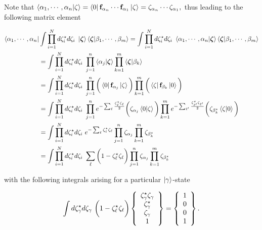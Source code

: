 \documentclass{homework}
\begin{document}
\begin{tcolorbox}
Note that $ \bra{\alpha_1, \cdots, \alpha_n} \ket{\zeta} = \bra{0} {{\bf f}}_{\alpha_n} \cdots {{\bf f}}_{\alpha_1} \ket{\zeta} = \zeta_{\alpha_n} \cdots \zeta_{\alpha_1},$
thus leading to the following matrix element

\begin{equation}
    \begin{split}
        \bra{\alpha_1, \cdots, \alpha_n}& \int \prod_{i=1}^{N} d\zeta^\star_i d\zeta_i \textnormal{ } \ket{\bm{\zeta}}\bra{\bm{\zeta}} \ket{\beta_1, \cdots, \beta_m} = \int \prod_{i=1}^{N} d\zeta^\star_i d\zeta_i \textnormal{ } \bra{\alpha_1, \cdots, \alpha_n}\ket{\bm{\zeta}} \bra{\bm{\zeta}} \ket{\beta_1, \cdots, \beta_m}\\
        &= \int \prod_{i=1}^{N} d\zeta^\star_i d\zeta_i \textnormal{ } \prod_{j=1}^{n} \bra{\alpha_j}\ket{\bm{\zeta}} \prod_{k=1}^{m} \bra{\bm{\zeta}} \ket{\beta_k} \\
        &= \int \prod_{i=1}^{N} d\zeta^\star_i d\zeta_i \textnormal{ } \prod_{j=1}^{n} \bigg(\bra{0} {{\bf f}}_{\alpha_j} \ket{\zeta}\bigg) \prod_{k=1}^{m}\bigg(\bra{\zeta} {{\bf f}}_{\beta_k} \ket{0}\bigg) \\
        &= \int \prod_{i=1}^{N} d\zeta^\star_i d\zeta_i \textnormal{ } \prod_{j=1}^{n} e^{-\sum_{\ell} \frac{\zeta^\star_\ell\zeta_\ell}{2}} \bigg(\zeta_{\alpha_j} \bra{0}\ket{\zeta} \bigg) \prod_{k=1}^{m} e^{-\sum_{{\ell'}} \frac{\zeta^\star_{\ell'}\zeta_{\ell'}}{2}}\bigg(\zeta_{\beta_{k}^\star} \bra{\zeta} \ket{0}\bigg) \\
        &= \int \prod_{i=1}^{N} d\zeta^\star_i d\zeta_i \textnormal{ } e^{-\sum_{\ell} {\zeta^\star_\ell\zeta_\ell}} \prod_{j=1}^{n} \zeta_{\alpha_j} \prod_{k=1}^{m} \zeta_{\beta_{k}^\star} \\
        &= \int \prod_{i=1}^{N} d\zeta^\star_i d\zeta_i \textnormal{ } \sum_{\ell} \bigg(1-\zeta^\star_\ell\zeta_\ell \bigg)  \prod_{j=1}^{n} \zeta_{\alpha_j} \prod_{k=1}^{m} \zeta_{\beta_{k}^\star}
 \end{split}
\end{equation}

with the following integrals arising for a particular $\ket{\gamma}$-state

\begin{equation}
    \int d\zeta_{\gamma}^\star  d\zeta_{\gamma} \textnormal{ } \bigg(1- \zeta^\star_\ell\zeta_\ell \bigg) \left\{\begin{array}{c}
         \zeta_{\gamma}^\star \zeta_{\gamma} \\ \zeta_{\gamma}^\star \\
         \zeta_{\gamma} \\
         1
    \end{array}\right\} = \left\{\begin{array}{c}
         1  \\
         0  \\
         0  \\
         1
    \end{array}\right\}.
\end{equation}


\end{tcolorbox}
\end{document}
